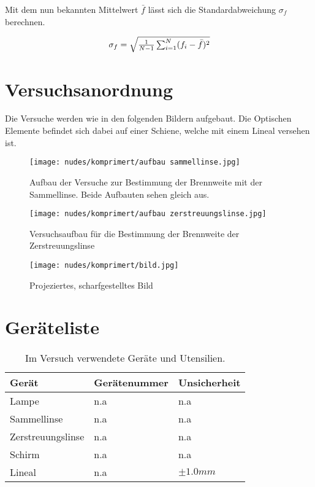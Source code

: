 \documentclass[12pt,a4paper,twoside]{article}
\begin{document}
\noindent
Mit dem nun bekannten Mittelwert $\bar{f}$ lässt sich die Standardabweichung $\sigma_{f}$ berechnen. 

\begin{equation}
    \label{eq:Standardabweichung}
    \centerline{$\sigma_{f} = \sqrt{\frac{1}{N-1} \sum_{i = 1}^{N} (f_i - \bar{f})^2}$} 
\end{equation}

\section{Versuchsanordnung} %
Die Versuche werden wie in den folgenden Bildern aufgebaut. Die Optischen Elemente befindet sich dabei auf einer Schiene, welche mit einem Lineal versehen ist. 


    \begin{figure}[H]
        \centering
        \texttt{[image: nudes/komprimert/aufbau sammellinse.jpg]}
        \caption{Aufbau der Versuche zur Bestimmung der Brennweite mit der Sammellinse. Beide Aufbauten sehen gleich aus. }
        \label{fig:aufbau Sammellinse}
    \end{figure}

    \begin{figure}[H]
        \centering
        \texttt{[image: nudes/komprimert/aufbau zerstreuungslinse.jpg]}
        \caption{Versuchsaufbau für die Bestimmung der Brennweite der Zerstreuungslinse}
        \label{fig:aufbau Zerstreuungslinse}
    \end{figure}

    \begin{figure}[H]
        \centering
        \texttt{[image: nudes/komprimert/bild.jpg]}
        \caption{Projeziertes, scharfgestelltes Bild}
        \label{fig:aufbau Bild}
    \end{figure}

\section{Geräteliste} %

    \begin{table}[H]
        \centering
        \caption{Im Versuch verwendete Geräte und Utensilien.}
        \label{tab:geraete}
        \begin{tabular}{| l | l | l |}
            \hline
            Gerät  & Gerätenummer  & Unsicherheit \\
            \hline
            Lampe & {n.a} & {n.a} \\
            Sammellinse & {n.a} & {n.a} \\
            Zerstreuungslinse & {n.a} & {n.a} \\
            Schirm & {n.a} & {n.a} \\
            Lineal & {n.a} & $\pm 1.0 mm$ \\
            \hline
        \end{tabular}
    \end{table}
\end{document}
